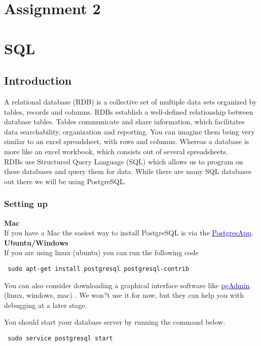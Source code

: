 \documentclass[a4paper]{article}
\begin{document}
\section{Assignment 2}

\section{SQL}
\subsection{Introduction}
A relational database (RDB) is a collective set of multiple data sets organized by tables, records and columns. RDBs establish a well-defined relationship between database tables. Tables communicate and share information, which facilitates data searchability, organization and reporting. You can imagine them being very similar to an excel spreadsheet, with rows and columns. Whereas a database is more like an excel workbook, which consists out of several spreadsheets.\\

RDBs use Structured Query Language (SQL) which allows us to program on these databases and query them for data. While there are many SQL databases out there we will be using PostgreSQL.\\
\subsubsection{Setting up}

\textbf{Mac}\\
If you have a Mac the easiest way to install PostgreSQL is via the \href{http://postgresapp.com}{\textcolor{blue}{ PostgresApp}}.
\textbf{Ubuntu/Windows}\\
If you are using linux (ubuntu) you can run the following code
\begin{lstlisting}
 sudo apt-get install postgresql postgresql-contrib
\end{lstlisting}
You can also consider downloading a graphical interface software like \href{https://www.pgadmin.org}{\textcolor{blue}{ pgAdmin}}.
 (linux, windows, mac) . We won?t use it for now, but they can help you with debugging at a later stage.

You should start your database server by running the command below.

\begin{lstlisting}
 sudo service postgresql start
\end{lstlisting}
\end{document}
